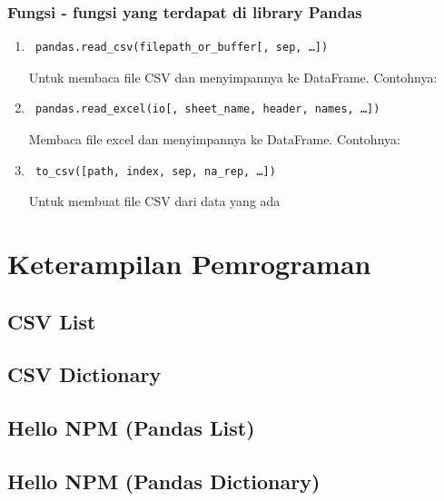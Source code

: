 \subsubsection{Fungsi - fungsi yang terdapat di library Pandas}
\begin{enumerate}
 \item \begin{verbatim} pandas.read_csv(filepath_or_buffer[, sep, …]) \end{verbatim} Untuk membaca file CSV dan menyimpannya ke DataFrame. Contohnya: 
 \item \begin{verbatim} pandas.read_excel(io[, sheet_name, header, names, …])  \end{verbatim} Membaca file excel dan menyimpannya ke DataFrame. Contohnya: 
 \item \begin{verbatim} to_csv([path, index, sep, na_rep, …]) \end{verbatim}
	Untuk membuat file CSV dari data yang ada
\end{enumerate}

\section{Keterampilan Pemrograman}
\subsection{CSV List}

\subsection{CSV Dictionary}

\subsection{Hello NPM (Pandas List)}

\subsection{Hello NPM (Pandas Dictionary)}

